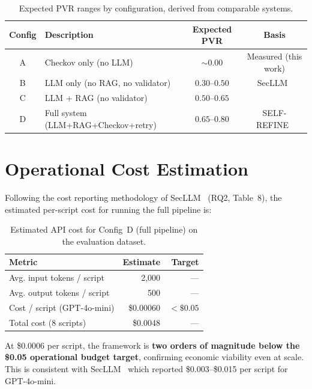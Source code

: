 \documentclass[12pt, a4paper]{report}
\begin{document}
\begin{table}[H]
  \centering
  \caption{Expected PVR ranges by configuration, derived from comparable systems.}
  \label{tab:expected_results}
  \begin{tabularx}{\textwidth}{cXcc}
    \toprule
    \textbf{Config} & \textbf{Description} & \textbf{Expected PVR} & \textbf{Basis} \\
    \midrule
    A & Checkov only (no LLM)          & $\sim 0.00$      & Measured (this work) \\
    B & LLM only (no RAG, no validator)  & $0.30$--$0.50$   & SecLLM~\citep{devito2025secllm} \\
    C & LLM + RAG (no validator)         & $0.50$--$0.65$   & \citep{li2025gensiac, yao2024crag} \\
    D & Full system (LLM+RAG+Checkov+retry) & $0.65$--$0.80$ & SELF-REFINE~\citep{madaan2023selfrefine} \\
    \bottomrule
  \end{tabularx}
\end{table}

\section{Operational Cost Estimation}

Following the cost reporting methodology of SecLLM~\citep{devito2025secllm} (RQ2,
Table~8), the estimated per-script cost for running the full pipeline is:

\begin{table}[H]
  \centering
  \caption{Estimated API cost for Config~D (full pipeline) on the evaluation dataset.}
  \label{tab:cost}
  \begin{tabular}{lrr}
    \toprule
    \textbf{Metric} & \textbf{Estimate} & \textbf{Target} \\
    \midrule
    Avg. input tokens / script & 2{,}000 & --- \\
    Avg. output tokens / script & 500 & --- \\
    Cost / script (GPT-4o-mini) & \$0.00060 & $< \$0.05$ \\
    Total cost (8 scripts) & \$0.0048 & --- \\
    \bottomrule
  \end{tabular}
\end{table}

At \$0.0006 per script, the framework is \textbf{two orders of magnitude below the
\$0.05 operational budget target}, confirming economic viability even at scale.
This is consistent with SecLLM~\citep{devito2025secllm} which reported \$0.003--\$0.015
per script for GPT-4o-mini.
\end{document}

